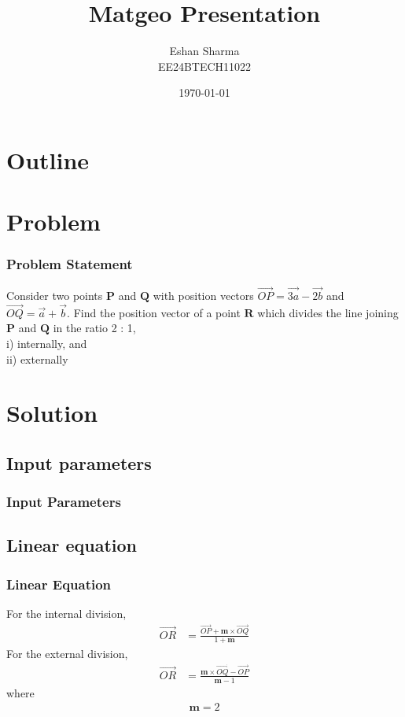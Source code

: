 \documentclass{beamer}
\title{Matgeo Presentation}
\author{Eshan Sharma \\ EE24BTECH11022}
\date{\today}
\theoremstyle{remark}
\let\vec\mathbf
\numberwithin{equation}{section}
\begin{document}
	
	\begin{frame}
		\titlepage
	\end{frame}
	
	\section*{Outline}
	\begin{frame}
		\tableofcontents
	\end{frame}
	\section{Problem}
	\begin{frame}
		\frametitle{Problem Statement}
		Consider two points $\vec{P}$ and $\vec{Q}$ with position vectors $\overrightarrow{OP} = \overrightarrow{3a} - \overrightarrow{2b}$ and $\overrightarrow{OQ} = \overrightarrow{a} + \overrightarrow{b}$. Find the position vector of a point $\vec{R}$ which divides the line joining $\vec{P}$ and $\vec{Q}$ in the ratio 2 : 1, \\ 
		i) internally, and \\
		ii) externally
	\end{frame}
	
	\section{Solution}
	\subsection{Input parameters}
	\begin{frame}
		\frametitle{Input Parameters}
		\begin{table}[H]    
			\centering
			
		\end{table}
	\end{frame}
	\subsection{Linear equation}
	\begin{frame}
		\frametitle{Linear Equation}
		For the internal division,
		\begin{align}
			\overrightarrow{OR} &= \frac{\overrightarrow{OP} + \vec{m} \times \overrightarrow{OQ}}{1+\vec{m}} 
		\end{align}
		For the external division,
		\begin{align}
			\overrightarrow{OR} &= \frac{\vec{m} \times \overrightarrow{OQ} - \overrightarrow{OP}}{\vec{m} - 1} 
		\end{align}
		where
		\begin{align}
			\vec{m} = 2
		\end{align}
	\end{frame}
\end{document}
